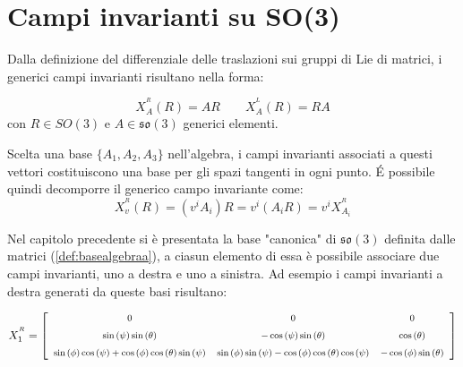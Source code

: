 \documentclass[11pt]{report}
\theoremstyle{plain}
\theoremstyle{definition}
\theoremstyle{remark}
\begin{document}

\section{Campi invarianti su SO(3)}

Dalla definizione del differenziale delle traslazioni sui gruppi di Lie di matrici, i generici campi invarianti risultano nella forma:

\begin{equation}
X_{A}^{^{R}} (R) =  A R \qquad X_{A}^{^{L}} (R) =  R A
\end{equation}
con $ R \in SO(3)$ e $ A \in \mathfrak{so(3)}$ generici elementi.

Scelta una base $ \lbrace A_{1},A_{2},A_{3} \rbrace$ nell'algebra, i campi invarianti associati a questi vettori costituiscono una base per gli spazi tangenti in ogni punto. É
possibile quindi decomporre il generico campo invariante come:
 \begin{displaymath}
 X_{v}^{^{R}} (R) =  (v^{i}A_{i}) R = v^{i} (A_{i} R) = v^{i}  X_{A_{i}}^{^{R}}
 \end{displaymath}

Nel capitolo precedente si è presentata la base "canonica" di $\mathfrak{so(3)}$ definita dalle matrici (\ref{def:basealgebraa}), a ciasun elemento di essa è possibile associare due campi invarianti, uno a destra e uno a sinistra. Ad esempio i campi invarianti a destra generati da queste basi risultano:

\begin{displaymath}\footnotesize
X_{1}^{^{R}} = \left[ \begin {array}{ccc} 0&0&0\\ \noalign{\medskip}\sin \left( \psi \right) \sin \left( \theta \right) &-\cos \left( \psi \right) \sin \left( \theta \right) &\cos \left( \theta \right) \\ \noalign{\medskip}\sin \left( \phi \right) \cos \left( \psi \right) +\cos \left( \phi \right) \cos \left( \theta \right) \sin \left( \psi \right) &\sin \left( \phi \right) \sin \left( \psi \right) -\cos \left( \phi \right) \cos \left( \theta \right) \cos \left( \psi \right) &-\cos \left( \phi \right) \sin \left( \theta \right) \end {array} \right]
\end{displaymath}
\end{document}
